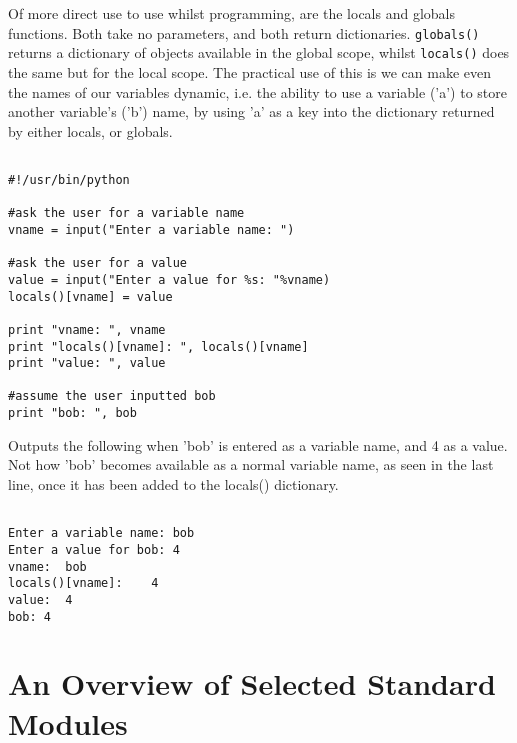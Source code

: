 Of more direct use to use whilst programming, are the locals and   globals functions. Both take no parameters, and both return   dictionaries. 
\texttt{globals()} returns a dictionary of objects   available in the global scope, whilst 
\texttt{locals()} does the   same but for the local scope. The practical use of this is we can make   even the names of our variables dynamic, i.e. the ability to use a   variable ('a') to store another variable's ('b') name, by using 'a' as   a key into the dictionary returned by either locals, or globals.
\begin{lstlisting}

#!/usr/bin/python

#ask the user for a variable name
vname = input("Enter a variable name: ")

#ask the user for a value
value = input("Enter a value for %s: "%vname)
locals()[vname] = value

print "vname: ", vname
print "locals()[vname]: ", locals()[vname]
print "value: ", value

#assume the user inputted bob
print "bob: ", bob
\end{lstlisting}

Outputs the following when 'bob' is entered as a variable name, and   4 as a value. Not how 'bob' becomes available as a normal variable   name, as seen in the last line, once it has been added to the locals()   dictionary.
\begin{lstlisting}

Enter a variable name: bob
Enter a value for bob: 4
vname:	bob
locals()[vname]:	4
value:	4
bob: 4
\end{lstlisting}

\section{An Overview of Selected Standard Modules}

